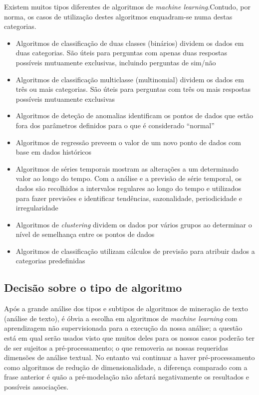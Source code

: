 Existem muitos tipos diferentes de algoritmos de \textit{machine learning}.Contudo, por norma, os casos de utilização destes algoritmos enquadram-se numa destas categorias.
\begin{itemize}
  \item Algoritmos de classificação de duas classes (binários) dividem os dados em duas categorias. São úteis para perguntas com apenas duas respostas possíveis mutuamente exclusivas, incluindo perguntas de sim/não
  \item Algoritmos de classificação multiclasse (multinomial) dividem os dados em três ou mais categorias. São úteis para perguntas com três ou mais respostas possíveis mutuamente exclusivas
  \item Algoritmos de deteção de anomalias identificam os pontos de dados que estão fora dos parâmetros definidos para o que é considerado ``normal''
  \item Algoritmos de regressão preveem o valor de um novo ponto de dados com base em dados históricos
  \item Algoritmos de séries temporais mostram as alterações a um determinado valor ao longo do tempo. Com a análise e a previsão de série temporal, os dados são recolhidos a intervalos regulares ao longo do tempo e utilizados para fazer previsões e identificar tendências, sazonalidade, periodicidade e irregularidade
  \item Algoritmos de \textit{clustering} dividem os dados por vários grupos ao determinar o nível de semelhança entre os pontos de dados
  \item Algoritmos de classificação utilizam cálculos de previsão para atribuir dados a categorias predefinidas
\end{itemize}

\subsection{Decisão sobre o tipo de algoritmo}

Após a grande análise dos tipos e subtipos de algoritmos de mineração de texto (análise de texto), é óbvia a escolha em algoritmos de \textit{machine learning} com aprendizagem não supervisionada para a execução da nossa análise; a questão está em qual serão usados visto que muitos deles para os nossos casos poderão ter de ser sujeitos a pré-processamento; o que removeria as nossas requeridas dimensões de análise textual.
No entanto vai continuar a haver pré-processamento como algoritmos de redução de dimensionalidade, a diferença comparado com a frase anterior é quão a pré-modelação não afetará negativamente os resultados e possíveis associações.

